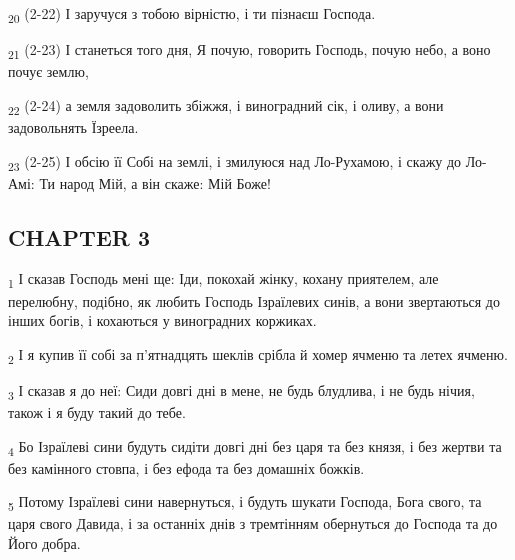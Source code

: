 \begin{tcolorbox}
\textsubscript{20} (2-22) І заручуся з тобою вірністю, і ти пізнаєш Господа.
\end{tcolorbox}
\begin{tcolorbox}
\textsubscript{21} (2-23) І станеться того дня, Я почую, говорить Господь, почую небо, а воно почує землю,
\end{tcolorbox}
\begin{tcolorbox}
\textsubscript{22} (2-24) а земля задоволить збіжжя, і виноградний сік, і оливу, а вони задовольнять Їзреела.
\end{tcolorbox}
\begin{tcolorbox}
\textsubscript{23} (2-25) І обсію її Собі на землі, і змилуюся над Ло-Рухамою, і скажу до Ло-Амі: Ти народ Мій, а він скаже: Мій Боже!
\end{tcolorbox}
\subsection{CHAPTER 3}
\begin{tcolorbox}
\textsubscript{1} І сказав Господь мені ще: Іди, покохай жінку, кохану приятелем, але перелюбну, подібно, як любить Господь Ізраїлевих синів, а вони звертаються до інших богів, і кохаються у виноградних коржиках.
\end{tcolorbox}
\begin{tcolorbox}
\textsubscript{2} І я купив її собі за п'ятнадцять шеклів срібла й хомер ячменю та летех ячменю.
\end{tcolorbox}
\begin{tcolorbox}
\textsubscript{3} І сказав я до неї: Сиди довгі дні в мене, не будь блудлива, і не будь нічия, також і я буду такий до тебе.
\end{tcolorbox}
\begin{tcolorbox}
\textsubscript{4} Бо Ізраїлеві сини будуть сидіти довгі дні без царя та без князя, і без жертви та без камінного стовпа, і без ефода та без домашніх божків.
\end{tcolorbox}
\begin{tcolorbox}
\textsubscript{5} Потому Ізраїлеві сини навернуться, і будуть шукати Господа, Бога свого, та царя свого Давида, і за останніх днів з тремтінням обернуться до Господа та до Його добра.
\end{tcolorbox}
